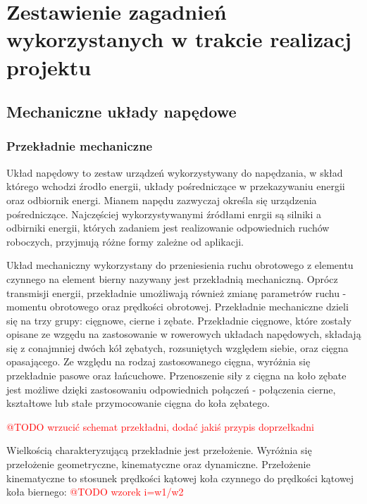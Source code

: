 \chapter{Zestawienie zagadnień wykorzystanych w trakcie realizacj projektu}
\label{cha:Zestawienie zagadnień wykorzystanych w pracy}

\section{Mechaniczne układy napędowe}
\subsection{Przekładnie mechaniczne}
Układ napędowy to zestaw urządzeń wykorzystywany do napędzania, w skład którego wchodzi źrodło energii, układy pośredniczące w przekazywaniu energii oraz odbiornik energi. Mianem napędu zazwyczaj określa się urządzenia pośredniczące. Najczęściej wykorzystywanymi źródłami enrgii są silniki a odbirniki energii, których zadaniem jest realizowanie odpowiednich ruchów roboczych, przyjmują różne formy zależne od aplikacji.

Układ mechaniczny wykorzystany do przeniesienia ruchu obrotowego z elementu czynnego na element bierny nazywany jest przekładnią mechaniczną. Oprócz transmisji energii, przekładnie umożliwają również zmianę parametrów ruchu - momentu obrotowego oraz prędkości obrotowej. Przekładnie mechaniczne dzieli się na trzy grupy: cięgnowe, cierne i zębate. Przekładnie cięgnowe, które zostały opisane ze wzgędu na zastosowanie w rowerowych układach napędowych, składają się z conajmniej dwóch kół zębatych, rozsuniętych względem siebie, oraz cięgna opasającego. Ze względu na rodzaj zastosowanego cięgna, wyróżnia się przekładnie pasowe oraz łańcuchowe. Przenoszenie siły z cięgna na koło zębate jest możliwe dzięki zastosowaniu odpowiednich połączeń - połączenia cierne, kształtowe lub stałe przymocowanie cięgna do koła zębatego.

\textcolor{red}{@TODO wrzucić schemat przekładni, dodać jakiś przypis doprzełkadni}

Wielkością charakteryzującą przekładnie jest przełożenie. Wyróżnia się przełożenie geometryczne, kinematyczne oraz dynamiczne. Przełożenie kinematyczne to stosunek prędkości kątowej koła czynnego do prędkości kątowej koła biernego:
\textcolor{red}{@TODO wzorek i=w1/w2}

